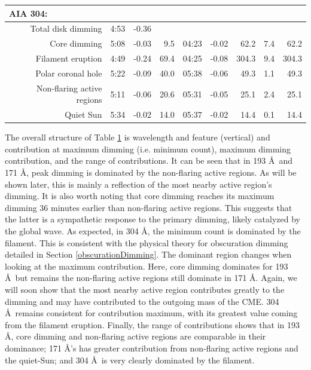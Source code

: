 \begin{table}
\begin{center}
{\begin{tabular}{r|rrr|rrr|r@{-}r}
\multicolumn{1}{l}{AIA 304:} \\
\hline
Total disk dimming & 4:53 & -0.36 & & & & & \\
Core dimming & 5:08 & -0.03 & 9.5 & 04:23 & -0.02 & 62.2 &  7.4 & 62.2 \\
Filament eruption & 4:49 & -0.24 & 69.4 & 04:25 & -0.08 & 304.3 &  9.4 & 304.3 \\
Polar coronal hole & 5:22 & -0.09 & 40.0 & 05:38 & -0.06 & 49.3 &  1.1 & 49.3 \\
Non-flaring active regions & 5:11 & -0.06 & 20.6 & 05:31 & -0.05 & 25.1 &  2.4 & 25.1 \\
Quiet Sun & 5:34 & -0.02 & 14.0 & 05:37 & -0.02 & 14.4 &  0.1 & 14.4 \\
\hline
\end{tabular}
}
\end{center}
\label{tab:aia2011aug4}
\end{table}

The overall structure of Table \ref{tab:aia2011aug4} is wavelength and feature (vertical) and contribution at maximum dimming (i.e. minimum count), maximum dimming contribution, and the range of contributions. It can be seen that in 193 \AA\ and 171 \AA, peak dimming is dominated by the non-flaring active regions. As will be shown later, this is mainly a reflection of the most nearby active region's dimming. It is also worth noting that core dimming reaches its maximum dimming 36 minutes earlier than non-flaring active regions. This suggests that the latter is a sympathetic response to the primary dimming, likely catalyzed by the global wave. As expected, in 304 \AA, the minimum count is dominated by the filament. This is consistent with the physical theory for obscuration dimming detailed in Section \ref{obscurationDimming}. The dominant region changes when looking at the maximum contribution. Here, core dimming dominates for 193 \AA\ but remains the non-flaring active regions still dominate in 171 \AA. Again, we will soon show that the most nearby active region contributes greatly to the dimming and may have contributed to the outgoing mass of the CME. 304 \AA\ remains consistent for contribution maximum, with its greatest value coming from the filament eruption. Finally, the range of contributions shows that in 193 \AA, core dimming and non-flaring active regions are comparable in their dominance; 171 \AA's has greater contribution from non-flaring active regions and the quiet-Sun; and 304 \AA\ is very clearly dominated by the filament. 

